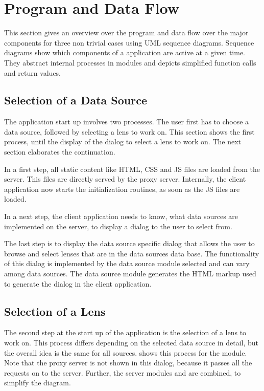 \section{Program and Data Flow}
\label{sec:pd_flow}

This section gives an overview over the program and data flow over the major components for three non trivial cases using UML sequence diagrams.
Sequence diagrams show which components of a application are active at a given time.
They abstract internal processes in modules and depicts simplified function calls and return values.



\subsection{Selection of a Data Source}

The application start up involves two processes.
The user first has to choose a data source, followed by selecting a lens to work on.
This section shows the first process, until the display of the dialog to select a lens to work on.
The next section elaborates the continuation.

In a first step, all static content like HTML, CSS and JS files are loaded from the server.
This files are directly served by the proxy server.
Internally, the client application now starts the initialization routines, as soon as the JS files are loaded.

In a next step, the client application needs to know, what data sources are implemented on the server, to display a dialog to the user to select from.

The last step is to display the data source specific dialog that allows the user to browse and select lenses that are in the data sources data base.
The functionality of this dialog is implemented by the data source module selected and can vary among data sources.
The data source module generates the HTML markup used to generate the dialog in the client application.



\subsection{Selection of a Lens}

The second step at the start up of the application is the selection of a lens to work on.
This process differs depending on the selected data source in detail, but the overall idea is the same for all sources.
 shows this process for the \sw module.
Note that the proxy server is not shown in this dialog, because it passes all the requests on to the server.
Further, the server modules  and  are combined, to simplify the diagram.

